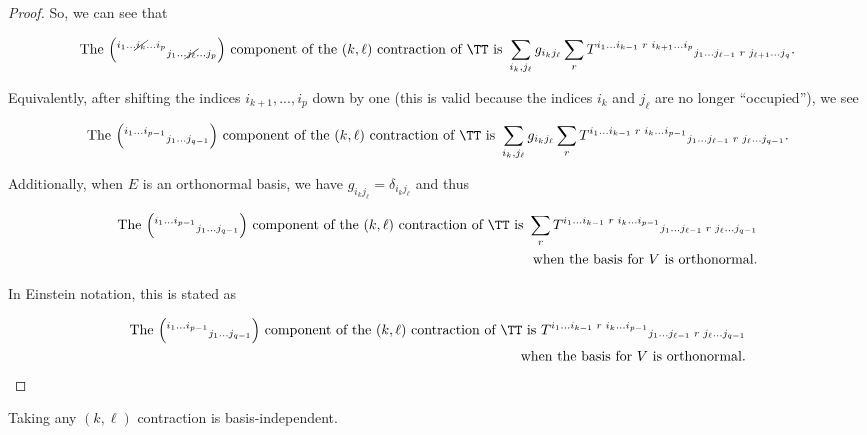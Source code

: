 \begin{proof}
    So, we can see that
    
    \begin{align*}
        \text{The $\Big( {}^{i_1 ... \cancel{i_k} ... i_p}{}_{j_1 ... \cancel{j_\ell} ... j_p} \Big)$ component of the $(k, \ell)$ contraction of $\TT$ is } \sum_{i_k, j_\ell} g_{i_k j_\ell} \sum_r T^{i_1 ... i_{k - 1} \spc r \spc i_{k + 1} ... i_p}{}_{j_1 ... j_{\ell - 1} \spc r \spc j_{\ell + 1} ... j_q}.
    \end{align*}

    Equivalently, after shifting the indices $i_{k + 1}, ..., i_p$ down by one (this is valid because the indices $i_k$ and $j_\ell$ are no longer ``occupied''), we see
        
    \begin{align*}
        \text{The $\Big( {}^{i_1 ... i_{p - 1}} {}_{j_1 ... j_{q - 1}} \Big)$ component of the $(k, \ell)$ contraction of $\TT$ is } \sum_{i_k, j_\ell} g_{i_k j_\ell} \sum_r T^{i_1 ... i_{k - 1} \spc r \spc i_k ... i_{p - 1}}{}_{j_1 ... j_{\ell - 1} \spc r \spc j_{\ell} ... j_{q - 1}}.
    \end{align*}
    
    Additionally, when $E$ is an orthonormal basis, we have $g_{i_k j_\ell} = \delta_{i_k j_\ell}$ and thus
    
    \begin{align*}
        \text{The $\Big( {}^{i_1 ... i_{p - 1}} {}_{j_1 ... j_{q - 1}} \Big)$ component of the $(k, \ell)$ contraction of $\TT$ is } \sum_r T^{i_1 ... i_{k - 1} \spc r \spc i_k ... i_{p - 1}}{}_{j_1 ... j_{\ell - 1} \spc r \spc j_{\ell} ... j_{q - 1}} \\ \text{when the basis for $V$ is orthonormal}.
    \end{align*}
    
    In Einstein notation, this is stated as
    
    \begin{align*}
        \text{The $\Big( {}^{i_1 ... i_{p - 1}} {}_{j_1 ... j_{q - 1}} \Big)$ component of the $(k, \ell)$ contraction of $\TT$ is } T^{i_1 ... i_{k - 1} \spc r \spc i_k ... i_{p - 1}}{}_{j_1 ... j_{\ell - 1} \spc r \spc j_{\ell} ... j_{q - 1}} \\ \text{when the basis for $V$ is orthonormal}.
    \end{align*}
\end{proof}

\begin{theorem}
    Taking any $(k, \ell)$ contraction is basis-independent.
\end{theorem}

